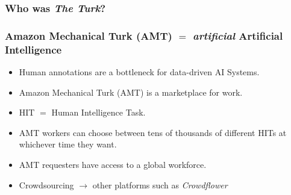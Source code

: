 \documentclass[10pt]{beamer}
\newenvironment{itemwide}%
{\begin{itemize}%
    \setlength{\itemsep}{5pt}%
    \setlength{\parskip}{5pt}}%
  {\end{itemize}}
\begin{document}
\begin{frame}
  \frametitle{Who was \textit{The Turk}?}
  \begin{center}
  \end{center}
\end{frame}

\begin{frame}
  \frametitle{Amazon Mechanical Turk (AMT) $=$ \textit{artificial} Artificial Intelligence}
	\begin{itemwide}
 	\item Human annotations are a bottleneck for data-driven AI Systems.
	\item Amazon Mechanical Turk (AMT) is a marketplace for work.
	\item HIT $=$ Human Intelligence Task.
	\item AMT workers can choose between tens of thousands of different HITs at whichever time they want.
	\item AMT requesters have access to a global workforce.
	\item Crowdsourcing $\rightarrow$ other platforms such as \textit{Crowdflower}
	\end{itemwide}
\end{frame}
\end{document}

